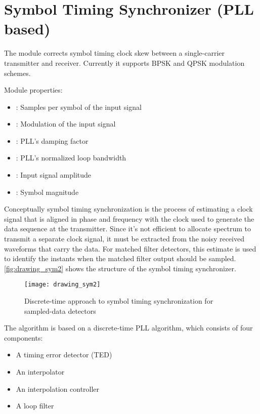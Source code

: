 \section{Symbol Timing Synchronizer (PLL based)}

The  module corrects symbol timing clock skew between a single-carrier transmitter and receiver. Currently it supports BPSK and QPSK modulation schemes.

\noindent Module properties:
\begin{itemize}
  \item {}: Samples per symbol of the input signal
  \item {}: Modulation of the input signal
  \item {}: PLL's damping factor
  \item {}: PLL's normalized loop bandwidth
  \item {}: Input signal amplitude
  \item {}: Symbol magnitude
\end{itemize}

Conceptually symbol timing synchronization is the process of estimating a clock signal that is aligned in phase and frequency with the clock used to generate the data sequence at the transmitter. Since it's not efficient to allocate spectrum to transmit a separate clock signal, it must be extracted from the noisy received waveforms that carry the data. For matched filter detectors, this estimate is used to identify the instants when the matched filter output should be sampled. \autoref{fig:drawing_sym2} shows the structure of the symbol timing synchronizer.

\begin{figure}[H]
  \centering
  \texttt{[image: drawing\_sym2]}
  \caption{Discrete-time approach to symbol timing synchronization for sampled-data detectors}
  \label{fig:drawing_sym2}
\end{figure}

The algorithm is based on a discrete-time PLL algorithm, which consists of four components:
\begin{itemize}
  \item A timing error detector (TED)
  \item An interpolator
  \item An interpolation controller
  \item A loop filter
\end{itemize}

